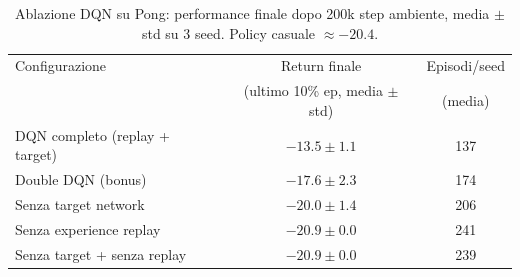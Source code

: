 \begin{table}[H]
\centering
\caption{Ablazione DQN su Pong: performance finale dopo 200k step ambiente, media $\pm$ std su 3 seed. Policy casuale $\approx -20.4$.}
\label{tab:pong-ablation}
\begin{tabular}{lcc}
\toprule
Configurazione & Return finale & Episodi/seed \\
               & (ultimo 10\% ep, media $\pm$ std) & (media) \\
\midrule
DQN completo (replay + target) & $-13.5 \pm 1.1$ & 137 \\
Double DQN (bonus) & $-17.6 \pm 2.3$ & 174 \\
Senza target network & $-20.0 \pm 1.4$ & 206 \\
Senza experience replay & $-20.9 \pm 0.0$ & 241 \\
Senza target + senza replay & $-20.9 \pm 0.0$ & 239 \\
\bottomrule
\end{tabular}
\end{table}
